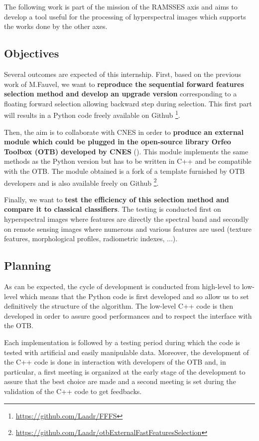 \documentclass[a4paper,11pt,DIV=16,abstracton]{scrartcl}
\begin{document}
    The following work is part of the mission of the RAMSSES axis and aims to develop a tool useful for the processing of hyperspectral images which supports the works done by the other axes.

    \subsection{Objectives}

    Several outcomes are expected of this internship. First, based on the previous work \cite{fauvel2015fast} of M.Fauvel, we want to {\bfseries reproduce the sequential forward features selection method and develop an upgrade version} corresponding to a floating forward selection allowing backward step during selection. This first part will results in a Python code freely available on Github \footnote{\url{https://github.com/Laadr/FFFS}}.

    Then, the aim is to collaborate with CNES in order to {\bfseries produce an external module which could be plugged in the open-source library Orfeo Toolbox (OTB) developed by CNES} (\cite{christophe2008orfeo}). This module implements the same methods as the Python version but has to be written in C++ and be compatible with the OTB. The module obtained is a fork of a template furnished by OTB developers and is also available freely on Github \footnote{\url{https://github.com/Laadr/otbExternalFastFeaturesSelection}}.

    Finally, we want to {\bfseries test the efficiency of this selection method and compare it to classical classifiers}. The testing is conducted first on hyperspectral images where features are directly the spectral band and secondly on remote sensing images where numerous and various features are used (texture features, morphological profiles, radiometric indexes, ...).

    \subsection{Planning}

    As can be expected, the cycle of development is conducted from high-level to low-level which means that the Python code is first developed and so allow us to set definitively the structure of the algorithm. The low-level C++ code is then developed in order to assure good performances and to respect the interface with the OTB.

    Each implementation is followed by a testing period during which the code is tested with artificial and easily manipulable data. Moreover, the development of the C++ code is done in interaction with developers of the OTB and, in particular, a first meeting is organized at the early stage of the development to assure that the best choice are made and a second meeting is set during the validation of the C++ code to get feedbacks.
\end{document}
